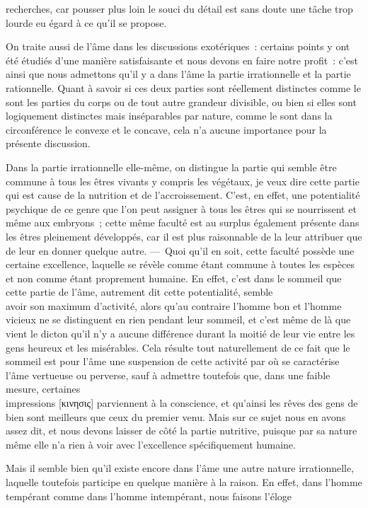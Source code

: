 \documentclass[french,twoside]{book} %
\begin{document}
recherches, car pousser plus loin le souci du détail est sans doute une tâche trop lourde eu égard à ce qu’il se propose.\par
On traite aussi de l’âme dans les discussions exotériques : certains points y ont été étudiés d’une manière satisfaisante et nous devons en faire notre profit : c’est ainsi que nous admettons qu’il y a dans l’âme la partie irrationnelle et la partie \\
rationnelle. Quant à savoir si ces deux parties sont réellement distinctes comme le sont les parties du corps ou de tout autre grandeur divisible, ou bien si elles sont logiquement distinctes mais inséparables par nature, comme le sont dans la circonférence le convexe et le concave, cela n’a aucune importance pour la présente discussion.\par
Dans la partie irrationnelle elle-même, on distingue la partie qui semble être commune à tous les êtres vivants y compris les végétaux, je veux dire cette partie qui est cause de la nutrition et de l’accroissement. C’est, en effet, une potentialité psychique de ce genre que l’on peut assigner à tous les  êtres qui se nourrissent et même aux embryons ; cette même faculté est au surplus également présente dans les êtres pleinement développés, car il est plus raisonnable de la leur attribuer que de leur en donner quelque autre. — Quoi qu’il en soit, cette faculté possède une certaine excellence, laquelle se révèle comme étant commune à toutes les espèces et non comme étant proprement humaine. En effet, c’est dans le sommeil que cette partie de l’âme, autrement dit cette potentialité, semble \\
avoir son maximum d’activité, alors qu’au contraire l’homme bon et l’homme vicieux ne se distinguent en rien pendant leur sommeil, et c’est même de là que vient le dicton qu’il n’y a aucune différence durant la moitié de leur vie entre les gens heureux et les misérables. Cela résulte tout naturellement de ce fait que le sommeil est pour l’âme une suspension de cette activité par où se caractérise l’âme vertueuse ou perverse, sauf à admettre toutefois que, dans une faible mesure, certaines \\
impressions [κινησις] parviennent à la conscience, et qu’ainsi les rêves des gens de bien sont meilleurs que ceux du premier venu. Mais sur ce sujet nous en avons assez dit, et nous devons laisser de côté la partie nutritive, puisque par sa nature même elle n’a rien à voir avec l’excellence spécifiquement humaine.\par
Mais il semble bien qu’il existe encore dans l’âme une autre nature irrationnelle, laquelle toutefois participe en quelque manière à la raison. En effet, dans l’homme tempérant comme dans l’homme intempérant, nous faisons l’éloge \\
\end{document}
